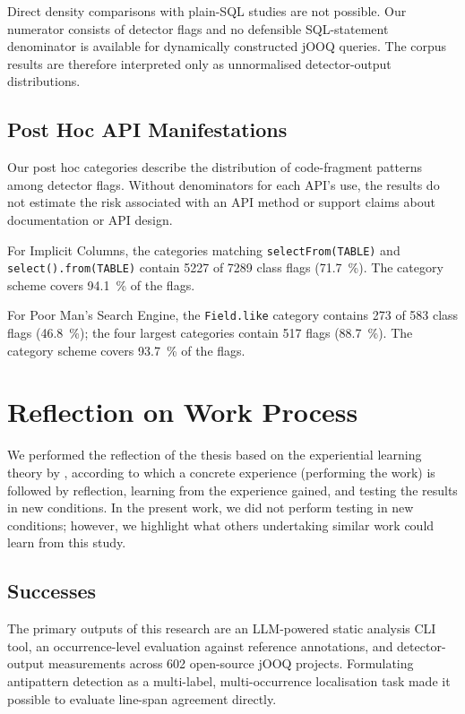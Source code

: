 Direct density comparisons with plain-SQL studies are not possible. Our numerator consists of detector flags and no defensible SQL-statement denominator is available for dynamically constructed jOOQ queries. The corpus results are therefore interpreted only as unnormalised detector-output distributions.

\subsection{Post Hoc API Manifestations}\label{sec:apiDesign}

Our post hoc categories describe the distribution of code-fragment patterns among detector flags. Without denominators for each API's use, the results do not estimate the risk associated with an API method or support claims about documentation or API design.

For Implicit Columns, the categories matching \texttt{selectFrom(TABLE)} and \texttt{select().from(TABLE)} contain \num{5227} of \num{7289} class flags (\qty{71.7}{\percent}). The category scheme covers \qty{94.1}{\percent} of the flags.

For Poor Man's Search Engine, the \texttt{Field.like} category contains \num{273} of \num{583} class flags (\qty{46.8}{\percent}); the four largest categories contain \num{517} flags (\qty{88.7}{\percent}). The category scheme covers \qty{93.7}{\percent} of the flags.

\section{Reflection on Work Process}\label{sec:reflection}

We performed the reflection of the thesis based on the experiential learning theory by , according to which a concrete experience (performing the work) is followed by reflection, learning from the experience gained, and testing the results in new conditions. In the present work, we did not perform testing in new conditions; however, we highlight what others undertaking similar work could learn from this study.

\subsection{Successes}

The primary outputs of this research are an LLM-powered static analysis CLI tool, an occurrence-level evaluation against reference annotations, and detector-output measurements across \num{602} open-source jOOQ projects. Formulating antipattern detection as a multi-label, multi-occurrence localisation task made it possible to evaluate line-span agreement directly.

